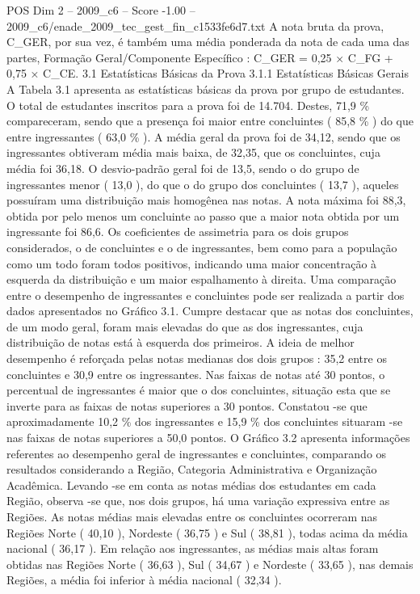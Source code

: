 \begin{textsample}{POS Dim 2 – 2009\_c6 – Score -1.00 – 2009\_c6/enade\_2009\_tec\_gest\_fin\_c1533fe6d7.txt}
A nota bruta da prova, C\_GER, por sua vez, é também uma média ponderada da nota de cada uma das partes, Formação Geral/Componente Específico : C\_GER = 0,25 × C\_FG + 0,75 × C\_CE. 3.1 Estatísticas Básicas da Prova 3.1.1 Estatísticas Básicas Gerais A Tabela 3.1 apresenta as estatísticas básicas da prova por grupo de estudantes.
O total de estudantes inscritos para a prova foi de 14.704.
Destes, 71,9 \% compareceram, sendo que a presença foi maior entre concluintes ( 85,8 \% ) do que entre ingressantes ( 63,0 \% ).
A média geral da prova foi de 34,12, sendo que os ingressantes obtiveram média mais baixa, de 32,35, que os concluintes, cuja média foi 36,18.
O desvio-padrão geral foi de 13,5, sendo o do grupo de ingressantes menor ( 13,0 ), do que o do grupo dos concluintes ( 13,7 ), aqueles possuíram uma distribuição mais homogênea nas notas.
A nota máxima foi 88,3, obtida por pelo menos um concluinte ao passo que a maior nota obtida por um ingressante foi 86,6.
Os coeficientes de assimetria para os dois grupos considerados, o de concluintes e o de ingressantes, bem como para a população como um todo foram todos positivos, indicando uma maior concentração à esquerda da distribuição e um maior espalhamento à direita.
Uma comparação entre o desempenho de ingressantes e concluintes pode ser realizada a partir dos dados apresentados no Gráfico 3.1.
Cumpre destacar que as notas dos concluintes, de um modo geral, foram mais elevadas do que as dos ingressantes, cuja distribuição de notas está à esquerda dos primeiros.
A ideia de melhor desempenho é reforçada pelas notas medianas dos dois grupos : 35,2 entre os concluintes e 30,9 entre os ingressantes.
Nas faixas de notas até 30 pontos, o percentual de ingressantes é maior que o dos concluintes, situação esta que se inverte para as faixas de notas superiores a 30 pontos.
Constatou -se que aproximadamente 10,2 \% dos ingressantes e 15,9 \% dos concluintes situaram -se nas faixas de notas superiores a 50,0 pontos.
O Gráfico 3.2 apresenta informações referentes ao desempenho geral de ingressantes e concluintes, comparando os resultados considerando a Região, Categoria Administrativa e Organização Acadêmica.
Levando -se em conta as notas médias dos estudantes em cada Região, observa -se que, nos dois grupos, há uma variação expressiva entre as Regiões.
As notas médias mais elevadas entre os concluintes ocorreram nas Regiões Norte ( 40,10 ), Nordeste ( 36,75 ) e Sul ( 38,81 ), todas acima da média nacional ( 36,17 ).
Em relação aos ingressantes, as médias mais altas foram obtidas nas Regiões Norte ( 36,63 ), Sul ( 34,67 ) e Nordeste ( 33,65 ), nas demais Regiões, a média foi inferior à média nacional ( 32,34 ).

\end{textsample}
